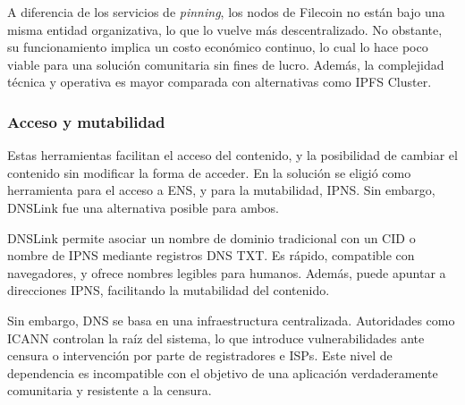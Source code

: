 A diferencia de los servicios de \textit{pinning}, los nodos de Filecoin no están bajo una misma entidad organizativa, lo que lo vuelve más descentralizado. No obstante, su funcionamiento implica un costo económico continuo, lo cual lo hace poco viable para una solución comunitaria sin fines de lucro. Además, la complejidad técnica y operativa es mayor comparada con alternativas como IPFS Cluster.

\subsubsection{Acceso y mutabilidad}

Estas herramientas facilitan el acceso del contenido, y la posibilidad de cambiar el contenido sin modificar la forma de acceder. En la solución se eligió como herramienta para el acceso a ENS, y para la mutabilidad, IPNS. Sin embargo, DNSLink fue una alternativa posible para ambos.

DNSLink \cite{dnslink} permite asociar un nombre de dominio tradicional con un CID o nombre de IPNS mediante registros DNS TXT. Es rápido, compatible con navegadores, y ofrece nombres legibles para humanos. Además, puede apuntar a direcciones IPNS, facilitando la mutabilidad del contenido.

Sin embargo, DNS se basa en una infraestructura centralizada. Autoridades como ICANN controlan la raíz del sistema, lo que introduce vulnerabilidades ante censura o intervención por parte de registradores e ISPs. Este nivel de dependencia es incompatible con el objetivo de una aplicación verdaderamente comunitaria y resistente a la censura.
